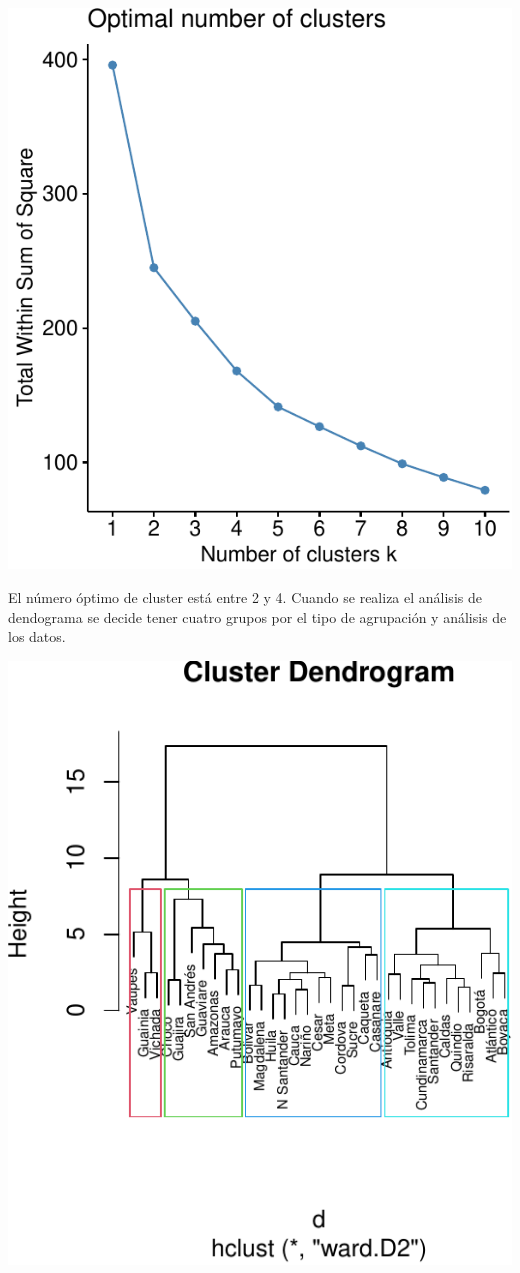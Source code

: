 \includegraphics{Anexo_Cluster_files/figure-latex/unnamed-chunk-4-1.pdf}

El número óptimo de cluster está entre 2 y 4. Cuando se realiza el
análisis de dendograma se decide tener cuatro grupos por el tipo de
agrupación y análisis de los datos.

\includegraphics{Anexo_Cluster_files/figure-latex/unnamed-chunk-5-1.pdf}

